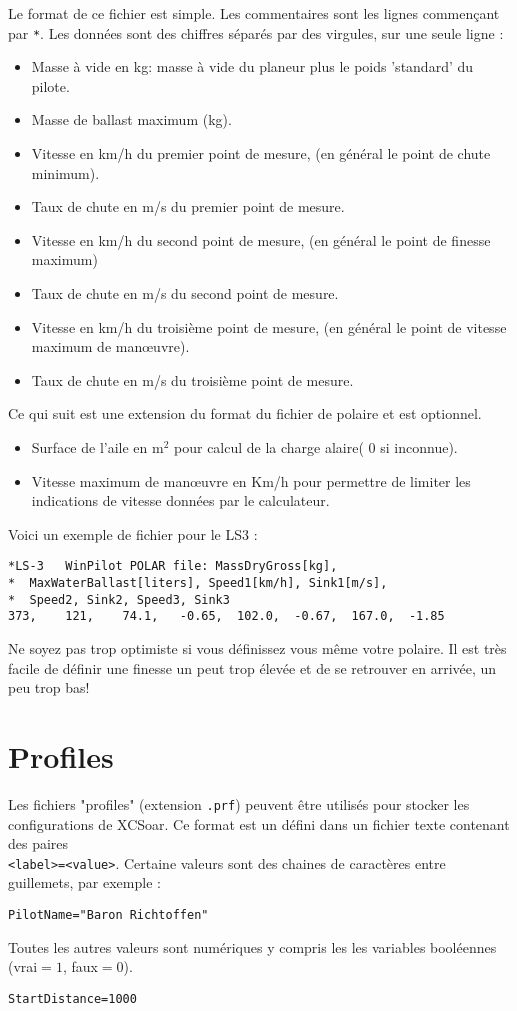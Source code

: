 Le format de ce fichier est simple. Les commentaires sont les lignes commençant par \verb|*|. Les données sont des chiffres séparés par des virgules, sur une seule ligne :
\begin{itemize}
\item Masse à vide en kg: masse à vide du planeur plus le poids 'standard' du pilote.
\item Masse de ballast maximum (kg).
\item Vitesse en km/h du premier point de mesure, (en général le point de chute minimum).
\item Taux de chute en m/s du premier point de mesure.
\item Vitesse en km/h du second point de mesure, (en général le point de finesse maximum)
\item Taux de chute en m/s du second point de mesure.
\item Vitesse en km/h du troisième point de mesure, (en général le point de vitesse maximum de manœuvre).
\item Taux de chute en m/s du troisième point de mesure.
\end{itemize}
Ce qui suit est une extension du format du fichier de polaire et est optionnel.
\begin{itemize}
\item Surface de l'aile en m$^2$ pour calcul de la charge alaire( 0 si inconnue).
\item Vitesse maximum de manœuvre en Km/h pour permettre de limiter les indications de vitesse données par le calculateur.
\end{itemize}

Voici un exemple de fichier pour le LS3 :
\begin{verbatim}
*LS-3	WinPilot POLAR file: MassDryGross[kg], 
*  MaxWaterBallast[liters], Speed1[km/h], Sink1[m/s], 
*  Speed2, Sink2, Speed3, Sink3  	
373,	121,	74.1,	-0.65,	102.0,	-0.67,	167.0,	-1.85
\end{verbatim}

\tip Ne soyez pas trop optimiste si vous définissez vous même votre polaire. Il est très facile de définir une finesse un peut trop élevée et de se retrouver en arrivée, un peu trop bas!
\section{Profiles}

Les fichiers "profiles" (extension \verb|.prf|) peuvent être utilisés pour stocker les configurations de XCSoar. Ce format est un défini dans un  fichier texte contenant des paires\\ \verb|<label>=<value>|. Certaine valeurs sont des chaines de caractères entre guillemets, par exemple :
\begin{verbatim}
PilotName="Baron Richtoffen"
\end{verbatim}
Toutes les autres valeurs sont numériques y compris les les variables booléennes (vrai$=1$, faux$=0$). 
\begin{verbatim}
StartDistance=1000
\end{verbatim}

